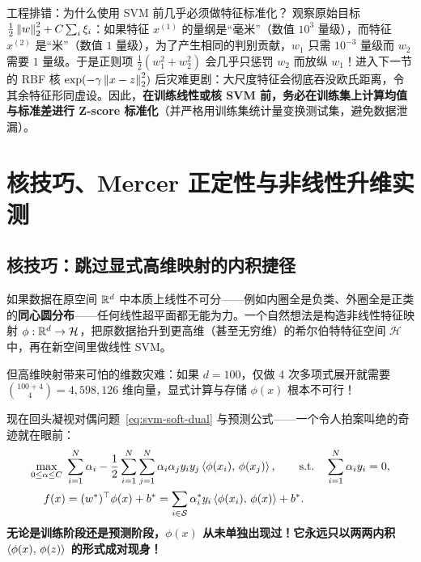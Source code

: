 \begin{failBox}{工程排错：为什么使用 SVM 前几乎必须做特征标准化？}
观察原始目标 $\frac{1}{2}\left\|w\right\|_2^2 + C\sum_i \xi_i$：如果特征 $x^{(1)}$ 的量纲是“毫米”（数值 $10^3$ 量级），而特征 $x^{(2)}$ 是“米”（数值 $1$ 量级），为了产生相同的判别贡献，$w_1$ 只需 $10^{-3}$ 量级而 $w_2$ 需要 $1$ 量级。于是正则项 $\frac{1}{2}(w_1^2 + w_2^2)$ 会几乎只惩罚 $w_2$ 而放纵 $w_1$！进入下一节的 RBF 核 $\exp(-\gamma\left\|x-z\right\|_2^2)$ 后灾难更剧：大尺度特征会彻底吞没欧氏距离，令其余特征形同虚设。因此，\textbf{在训练线性或核 SVM 前，务必在训练集上计算均值与标准差进行 Z-score 标准化}（并严格用训练集统计量变换测试集，避免数据泄漏）。
\end{failBox}

\section{核技巧、Mercer 正定性与非线性升维实测}\label{sec:svm-kernel}

\subsection{核技巧：跳过显式高维映射的内积捷径}

如果数据在原空间 $\mathbb{R}^d$ 中本质上线性不可分——例如内圈全是负类、外圈全是正类的\textbf{同心圆分布}——任何线性超平面都无能为力。一个自然想法是构造非线性特征映射 $\phi: \mathbb{R}^d \to \mathcal{H}$，把原数据抬升到更高维（甚至无穷维）的希尔伯特特征空间 $\mathcal{H}$ 中，再在新空间里做线性 SVM。

但高维映射带来可怕的维数灾难：如果 $d = 100$，仅做 4 次多项式展开就需要 $\binom{100+4}{4} = 4{,}598{,}126$ 维向量，显式计算与存储 $\phi(x)$ 根本不可行！

现在回头凝视对偶问题~\eqref{eq:svm-soft-dual} 与预测公式——一个令人拍案叫绝的奇迹就在眼前：
\begin{align}
  \max_{0 \le \alpha \le C}\;& \sum_{i=1}^{N}\alpha_i - \frac{1}{2}\sum_{i=1}^{N}\sum_{j=1}^{N}\alpha_i \alpha_j y_i y_j \left\langle \phi(x_i),\, \phi(x_j) \right\rangle, \qquad \text{s.t.}\quad \sum_{i=1}^{N}\alpha_i y_i = 0, \label{eq:svm-kernel-dual}\\
  f(x) &= (w^*)^\top \phi(x) + b^* = \sum_{i \in \mathcal{S}} \alpha_i^* y_i \left\langle \phi(x_i),\, \phi(x) \right\rangle + b^*. \label{eq:svm-kernel-pred}
\end{align}
\textbf{无论是训练阶段还是预测阶段，$\phi(x)$ 从未单独出现过！它永远只以两两内积 $\left\langle \phi(x),\, \phi(z) \right\rangle$ 的形式成对现身！}

